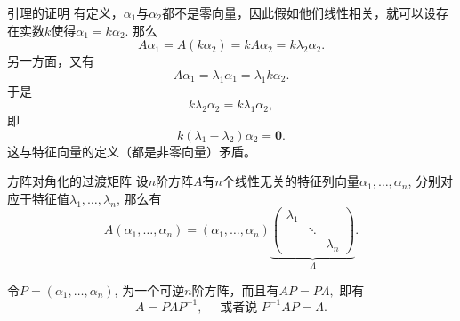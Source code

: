 \documentclass[10pt]{beamer}
\begin{document}

\begin{frame}

\begin{block}{引理的证明}
有定义，$\alpha_1$与$\alpha_2$都不是零向量，因此假如他们线性相关，就可以设存在实数$k$使得$\alpha_1=k\alpha_2$. 那么
$$A\alpha_1 = A(k\alpha_2) = kA\alpha_2 = k\lambda_2\alpha_2.$$
另一方面，又有
$$A\alpha_1 = \lambda_1\alpha_1 = \lambda_1k\alpha_2.$$
于是
$$k\lambda_2\alpha_2 = k\lambda_1\alpha_2,$$
即
$$k(\lambda_1-\lambda_2)\alpha_2 = \mathbf{0}.$$
这与特征向量的定义（都是非零向量）矛盾。
\end{block}

\end{frame}


\begin{frame}

\begin{block}{方阵对角化的过渡矩阵}
设$n$阶方阵$A$有$n$个线性无关的特征列向量$\alpha_1,\ldots,\alpha_n$, 分别对应于特征值$\lambda_1,\ldots,\lambda_n$, 那么有
$$A(\alpha_1,\ldots,\alpha_n) = (\alpha_1,\ldots,\alpha_n) \underbrace{\begin{pmatrix} \lambda_1 & & \\ & \ddots & \\ & & \lambda_n \end{pmatrix}}_{\Lambda}.$$

\vspace{1em}
\pause

令$P = (\alpha_1,\ldots,\alpha_n)$, 为一个可逆$n$阶方阵，而且有$AP = P\Lambda,$ 即有
$$A = P\Lambda P^{-1}, \quad \text{ 或者说 } P^{-1}AP = \Lambda.$$
\end{block}

\end{frame}

\end{document}

